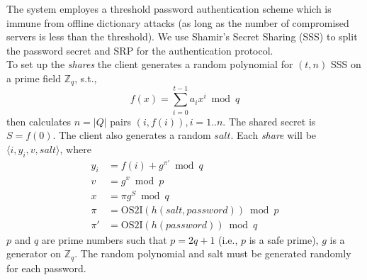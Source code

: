 The system employes a threshold password authentication scheme which
is immune from offline dictionary attacks (as long as the number of
compromised servers is less than the threshold). We use Shamir's
Secret Sharing (SSS) to split the password secret and SRP \cite{srp}
for the authentication protocol.\\

To set up the {\em shares} the client generates a random polynomial
for $(t, n)$ SSS on a prime field $\mathbb{Z}_q$, s.t.,
\[
  f(x) = \sum_{i=0}^{t-1}a_ix^i \bmod q
\]
then calculates $n=|Q|$ pairs $(i,f(i)), i = 1..n$. The shared secret
is $S = f(0)$. The client also generates a random $salt$. Each {\em
share} will be $\langle i, y_i, v, salt \rangle$, where
\begin{align*}
  y_i &= f(i) + g^{\pi'} \bmod q \\
  v &= g^x \bmod p \\
  x &= \pi g^S \bmod q \\
  \pi &= \text{OS2I}(h(salt, password)) \bmod p \\
  \pi' &= \text{OS2I}(h(password)) \bmod q
\end{align*}
$p$ and $q$ are prime numbers such that $p = 2q + 1$ (i.e., $p$ is a
safe prime), $g$ is a generator on $\mathbb{Z}_q$. The random
polynomial and salt must be generated randomly for each password.\\

